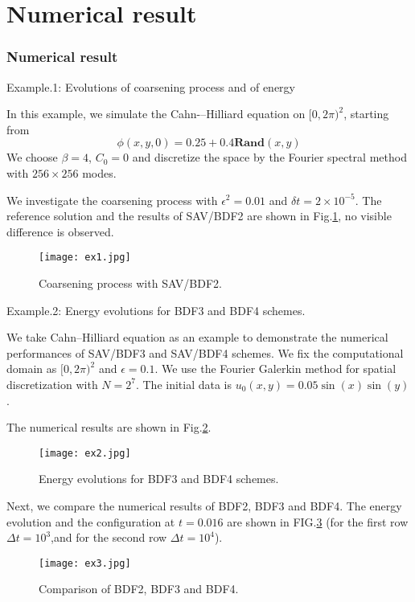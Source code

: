 \documentclass{beamer}
\begin{document}
\section{Numerical result}
\begin{frame}[allowframebreaks]
    \frametitle{Numerical result}

    Example.1: Evolutions of coarsening process and of energy\cite{SHEN2018407}
    
    In this example, we simulate the Cahn-–Hilliard equation on $[0,2\pi)^2$, starting from
\begin{equation}
\phi(x,y,0)=0.25+0.4\textbf{Rand}(x,y)
\end{equation}
We choose $\beta=4$, $C_0=0$ and discretize the space by the Fourier spectral method with $256\times 256$ modes.

We investigate the coarsening process with $\epsilon^2=0.01$ and $\delta t=2\times 10^{-5}$. The reference solution and the results of SAV/BDF2 are shown in Fig.\ref{fig:1}, no visible difference is observed.
        
\begin{figure}[htb]%
	\centering  %
	\texttt{[image: ex1.jpg]}  %
	\caption{Coarsening process with SAV/BDF2.}  %
	\label{fig:1}   %
\end{figure}
    
Example.2: Energy evolutions for BDF3 and BDF4 schemes.\cite{article}

We take Cahn--Hilliard equation as an example to demonstrate the numerical performances of SAV/BDF3 and SAV/BDF4 schemes. We fix the computational domain as $[0,2\pi)^2$ and $\epsilon=0.1$. We use the Fourier Galerkin method for spatial discretization with $N=2^7$. The initial data is $u_0(x,y)=0.05\sin(x)\sin(y)$.

The numerical results are shown in Fig.\ref{fig:2}.

\begin{figure}[htb]%
	\centering  %
	\texttt{[image: ex2.jpg]}  %
	\caption{Energy evolutions for BDF3 and BDF4 schemes.}  %
	\label{fig:2}   %
\end{figure}

Next, we compare the numerical results of BDF2, BDF3 and BDF4. The energy evolution and the configuration at $t=0.016$ are shown in FIG.\ref{fig:3} (for the first row $\Delta t=10^3$,and for the second row $\Delta t=10^4$).

\begin{figure}[htb]%
	\centering  %
	\texttt{[image: ex3.jpg]}  %
	\caption{Comparison of BDF2, BDF3 and BDF4.}  %
	\label{fig:3}   %
\end{figure}
\end{frame}
    
\end{document}
